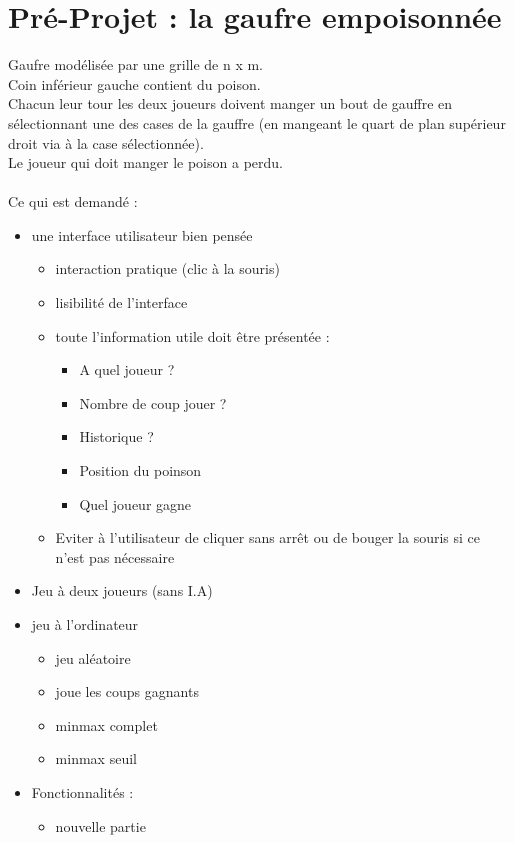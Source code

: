 \documentclass{article}
\begin{document}
\section{Pré-Projet : la gaufre empoisonnée}
Gaufre modélisée par une grille de n x m.\\
Coin inférieur gauche contient du poison.\\
Chacun leur tour les deux joueurs doivent manger un bout de gauffre en sélectionnant une des cases de la gauffre (en mangeant le quart de plan supérieur droit via à la case sélectionnée).\\
Le joueur qui doit manger le poison a perdu.\\\\
Ce qui est demandé : \\
\begin{itemize}
\item une interface utilisateur bien pensée
  \begin{itemize}
  \item interaction pratique (clic à la souris)
  \item lisibilité de l'interface
  \item toute l'information utile doit être présentée :
    \begin{itemize}
    \item A quel joueur ?
    \item Nombre de coup jouer ?
    \item Historique ?
    \item Position du poinson
    \item Quel joueur gagne
    \end{itemize}
  \item Eviter à l'utilisateur de cliquer sans arrêt ou de bouger la souris si ce n'est pas nécessaire
  \end{itemize}
\item Jeu à deux joueurs (sans I.A)
\item jeu à l'ordinateur 
  \begin{itemize}
  \item jeu aléatoire
  \item joue les coups gagnants
  \item minmax complet
  \item minmax seuil
  \end{itemize}
\item Fonctionnalités :
  \begin{itemize}
  \item nouvelle partie

\end{itemize}
\end{itemize}
\end{document}
